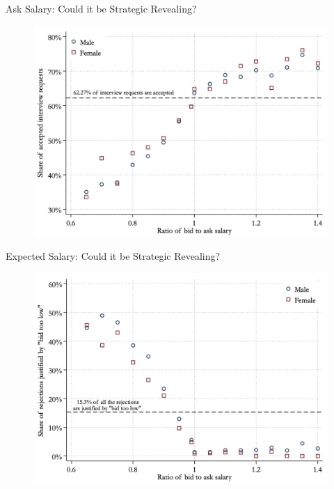 \begin{frame}{Ask Salary: Could it be Strategic Revealing?}
    \begin{figure}
        \centering
        \includegraphics[height = 0.7 \textheight]{images/ask1.png}
    \end{figure}
\end{frame}

\begin{frame}{Expected Salary: Could it be Strategic Revealing?}
    \begin{figure}
        \centering
        \includegraphics[height = 0.7 \textheight]{images/ask2.png}
    \end{figure}
\end{frame}

